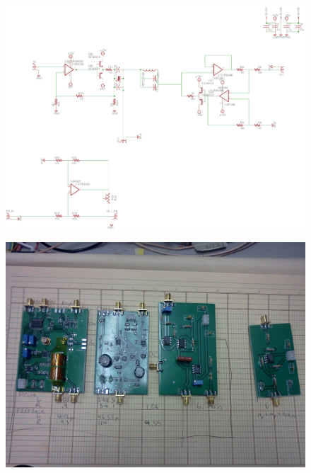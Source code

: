 \documentclass[journal,12pt,onecolumn,draftclsnofoot]{IEEEtran}
\begin{document}
\begin{figure}[h!]
\centering
\includegraphics[width=5in]{finalplots/drive_feedback}
\caption{}
\label{fig:drive_feedback}
\end{figure}


\begin{figure}[h!]
\centering
\includegraphics[width=5in]{finalplots/pcbs}
\caption{}
\label{fig:pcbs}
\end{figure}
\end{document}
